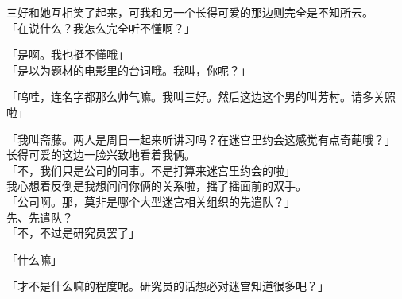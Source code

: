 三好和她互相笑了起来，可我和另一个长得可爱的那边则完全是不知所云。\\

「在说什么？我怎么完全听不懂啊？」

「是啊。我也挺不懂哦」\\

「是以为题材的电影里的台词哦。我叫，你呢？」

「呜哇，连名字都那么帅气嘛。我叫三好。然后这边这个男的叫芳村。请多关照啦」

「我叫斋藤。两人是周日一起来听讲习吗？在迷宫里约会这感觉有点奇葩哦？」\\

长得可爱的这边一脸兴致地看着我俩。\\

「不，我们只是公司的同事。不是打算来迷宫里约会的啦」\\

我心想着反倒是我想问问你俩的关系啦，摇了摇面前的双手。\\

「公司啊。那，莫非是哪个大型迷宫相关组织的先遣队？」\\

先、先遣队？\\

「不，不过是研究员罢了」

「什么嘛」

「才不是什么嘛的程度呢。研究员的话想必对迷宫知道很多吧？」\\

